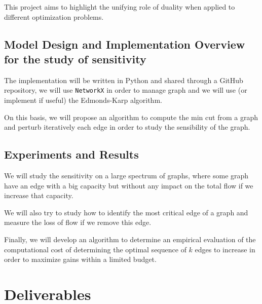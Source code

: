 \documentclass[12pt, openany]{article}
\begin{document}
This project aims to highlight the unifying role of duality when applied to different optimization problems.

\subsection{Model Design and Implementation Overview for the study of sensitivity}

The implementation will be written in Python and shared through a GitHub repository, we will use \texttt{NetworkX} in order to manage graph and we will use (or implement if useful) the Edmonds-Karp algorithm.

On this basis, we will propose an algorithm to compute the min cut from a graph and perturb iteratively each edge in order to study the sensibility of the graph.

\subsection{Experiments and Results}

We will study the sensitivity on a large spectrum of graphs, where some graph have an edge with a big capacity but without any impact on the total flow if we increase that capacity.

We will also try to study how to identify the most critical edge of a graph and measure the loss of flow if we remove this edge.

Finally, we will develop an algorithm to determine an empirical evaluation of the computational cost of determining the optimal sequence of $k$ edges to increase in order to maximize gains within a limited budget.

\section{Deliverables}
\end{document}
